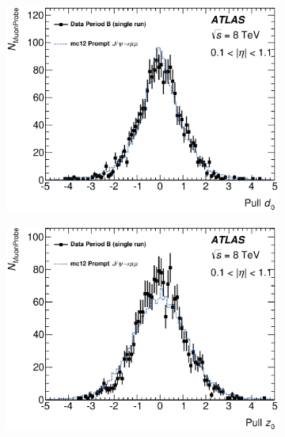 \begin{figure}[htbp]
    \begin{subfigure}[b]{0.49\textwidth}
      \includegraphics[width=\textwidth]{PartCalibration2012/Plots/DiscrepancyStudy/Pull/h_pull_d0_Nominal.eps}
      \caption{} \label{fig:CalibrationPullD0}
    \end{subfigure}
    \hfill
    \begin{subfigure}[b]{0.49\textwidth}
      \includegraphics[width=\textwidth]{PartCalibration2012/Plots/DiscrepancyStudy/Pull/h_pull_z0_Nominal.eps}
      \caption{} \label{fig:CalibrationPullZ0}
    \end{subfigure}


\end{figure}
